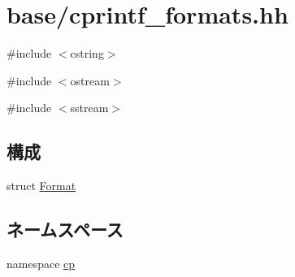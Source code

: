 \hypertarget{cprintf__formats_8hh}{
\section{base/cprintf\_\-formats.hh}
\label{cprintf__formats_8hh}
}
{\ttfamily \#include $<$cstring$>$}\par
{\ttfamily \#include $<$ostream$>$}\par
{\ttfamily \#include $<$sstream$>$}\par
\subsection*{構成}
\begin{DoxyCompactItemize}
\item 
struct \hyperlink{structcp_1_1Format}{Format}
\end{DoxyCompactItemize}
\subsection*{ネームスペース}
\begin{DoxyCompactItemize}
\item 
namespace \hyperlink{namespacecp}{cp}
\end{DoxyCompactItemize}
